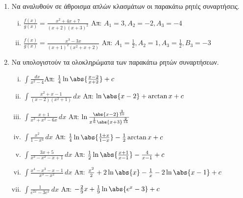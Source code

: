 


\geometry{top=2cm}
\pagestyle{askhseis}
\everymath{\displaystyle}





\begin{center}
  \minibox{\bfseries\large \textcolor{Col1}{Ασκήσεις στα Αόριστα Ολοκληρώματα}}
\end{center}

\vspace{\baselineskip}

\begin{enumerate}
  \item \label{ask:anal} Να αναλυθούν σε άθροισμα απλών κλασμάτων οι παρακάτω ρητές 
    συναρτήσεις.
    \begin{enumerate}[i)]
      \item $\frac{f(x)}{g(x)}=\frac{x^2+4x+7}{(x+2)(x+3)^2}$ 
        \hfill Απ: $A_1=3, A_2=-2, A_3=-4$
      \item $\frac{f(x)}{g(x)}=\frac{x^3-3x}{(x+1)^2(x^2+x+2)}$ 
        \hfill Απ: $A_1=\frac{1}{2}, A_2=1, A_3=\frac{1}{2}, B_3=-3$
    \end{enumerate}

  \item \label{ask:rhtes} Να υπολογιστούν τα ολοκληρώματα των παρακάτω ρητών συναρτήσεων.
    \begin{enumerate}[i)]
      \item $\int\frac{dx}{x^2-4}$\hfill Απ: $\frac{1}{4}\ln\abs{\frac{x-2}{x+2}}+c$
      \item $\int\frac{x^2+x-1}{(x-2)(x^2+1)}\,dx$ \hfill Απ: $\ln\abs{x-2}+\arctan x+c$
      \item $\int\frac{x+1}{x^3+x^2-6x}\,dx$ 
        \hfill Απ: $\ln\frac{\abs{x-2}^{\frac{3}{10}}}{x^{\frac{1}{6}}\abs{x+3}^
        {\frac{2}{15}}}$
      \item $\int\frac{x^2}{1-x^4}\,dx$ 
        \hfill Απ: $\frac{1}{4}\ln\abs{\frac{1+x}{1-x}}-\frac{1}{2}\arctan x+c$
      \item $\int\frac{3x+5}{x^3-x^2-x+1}\, dx$ 
        \hfill Απ: $\frac{1}{2}\ln\abs{\frac{x+1}{x-1}}-\frac{4}{x-1}+c$ 
      \item $\int\frac{x^4-x^3-x-1}{x^3-x^2}\,dx$ 
        \hfill Απ: $\frac{x^2}{2}+2\ln\abs{x}-\frac{1}{x}-2\ln\abs{x-1}+c$
      \item \label{ex:seven} $\int\frac{1}{e^{2x}-3e^{x}}\,dx$ 
        \hfill Απ: $-\frac{2}{9}x+\frac{1}{9}\ln\abs{e^x-3}+c$
    \end{enumerate}


\end{enumerate}
